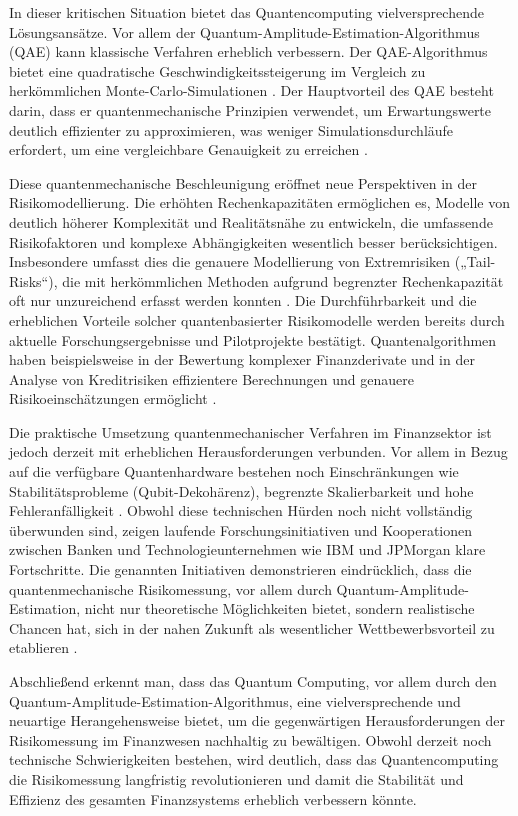 In dieser kritischen Situation bietet das Quantencomputing vielversprechende Lösungsansätze. Vor allem der Quantum-Amplitude-Estimation-Algorithmus (QAE) kann klassische Verfahren erheblich verbessern. Der QAE-Algorithmus bietet eine quadratische Geschwindigkeitssteigerung im Vergleich zu herkömmlichen Monte-Carlo-Simulationen \cite{quantumjournal2020,rebentrost2018}. Der Hauptvorteil des QAE besteht darin, dass er quantenmechanische Prinzipien verwendet, um Erwartungswerte deutlich effizienter zu approximieren, was weniger Simulationsdurchläufe erfordert, um eine vergleichbare Genauigkeit zu erreichen \cite{quantumjournal2020,martin2022}.

Diese quantenmechanische Beschleunigung eröffnet neue Perspektiven in der Risikomodellierung. Die erhöhten Rechenkapazitäten ermöglichen es, Modelle von deutlich höherer Komplexität und Realitätsnähe zu entwickeln, die umfassende Risikofaktoren und komplexe Abhängigkeiten wesentlich besser berücksichtigen. Insbesondere umfasst dies die genauere Modellierung von Extremrisiken („Tail-Risks“), die mit herkömmlichen Methoden aufgrund begrenzter Rechenkapazität oft nur unzureichend erfasst werden konnten \cite{orus2019,orus2018}. Die Durchführbarkeit und die erheblichen Vorteile solcher quantenbasierter Risikomodelle werden bereits durch aktuelle Forschungsergebnisse und Pilotprojekte bestätigt. Quantenalgorithmen haben beispielsweise in der Bewertung komplexer Finanzderivate und in der Analyse von Kreditrisiken effizientere Berechnungen und genauere Risikoeinschätzungen ermöglicht \cite{egger2020,rebentrost2018}.

Die praktische Umsetzung quantenmechanischer Verfahren im Finanzsektor ist jedoch derzeit mit erheblichen Herausforderungen verbunden. Vor allem in Bezug auf die verfügbare Quantenhardware bestehen noch Einschränkungen wie Stabilitätsprobleme (Qubit-Dekohärenz), begrenzte Skalierbarkeit und hohe Fehleranfälligkeit \cite{bouland2020,martin2022}. Obwohl diese technischen Hürden noch nicht vollständig überwunden sind, zeigen laufende Forschungsinitiativen und Kooperationen zwischen Banken und Technologieunternehmen wie IBM und JPMorgan klare Fortschritte. Die genannten Initiativen demonstrieren eindrücklich, dass die quantenmechanische Risikomessung, vor allem durch Quantum-Amplitude-Estimation, nicht nur theoretische Möglichkeiten bietet, sondern realistische Chancen hat, sich in der nahen Zukunft als wesentlicher Wettbewerbsvorteil zu etablieren \cite{orus2019,martin2022}.

Abschließend erkennt man, dass das Quantum Computing, vor allem durch den Quantum-Amplitude-Estimation-Algorithmus, eine vielversprechende und neuartige Herangehensweise bietet, um die gegenwärtigen Herausforderungen der Risikomessung im Finanzwesen nachhaltig zu bewältigen. Obwohl derzeit noch technische Schwierigkeiten bestehen, wird deutlich, dass das Quantencomputing die Risikomessung langfristig revolutionieren und damit die Stabilität und Effizienz des gesamten Finanzsystems erheblich verbessern könnte.

